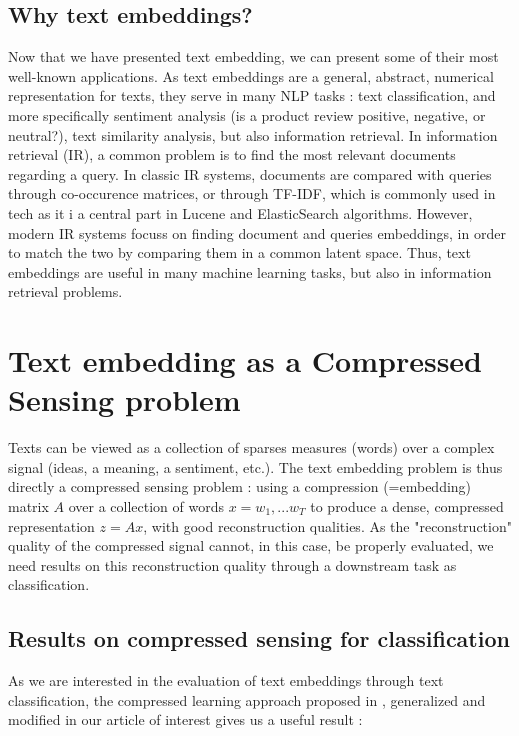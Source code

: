 \documentclass{article}
\begin{document}
\subsection{Why text embeddings? }


Now that we have presented text embedding, we can present some of 
their most well-known applications. As text embeddings 
are a general, abstract, numerical representation for texts, 
they serve in many NLP tasks : text classification, and 
more specifically sentiment analysis (is a product review positive, 
negative, or neutral?), text similarity analysis, but 
also information retrieval. In information retrieval (IR), 
a common problem is to find the most relevant documents 
regarding a query. In classic IR systems, documents are compared 
with queries through co-occurence matrices, or through TF-IDF, 
which is commonly used in tech as it i a central part in 
Lucene and ElasticSearch algorithms. However, modern IR 
systems focuss on finding document and queries embeddings, 
in order to match the two by comparing them in a common 
latent space. Thus, text embeddings are useful in many 
machine learning tasks, but also in information retrieval 
problems. 

\newpage
\section{Text embedding as a Compressed Sensing problem}

Texts can be viewed as a collection of sparses measures (words) 
over a complex signal (ideas, a meaning, a sentiment, etc.). The
text embedding problem is thus directly a compressed sensing problem : 
using a compression (=embedding) matrix $A$ over a collection of 
words $x=w_1, ...w_T$ to produce a dense, compressed representation 
$z = Ax$, with good reconstruction qualities. As the "reconstruction"
quality of the compressed signal cannot, in this case, 
be properly evaluated, we need results on this reconstruction
quality through a downstream task as classification. 

\subsection{Results on compressed sensing for classification}

As we are interested in the evaluation of text embeddings through 
text classification, the compressed learning approach proposed 
in \cite{Calderbank2009CompressedL}, generalized and modified in 
our article of interest \cite{arora2018sensing} gives us a useful result :
\end{document}
